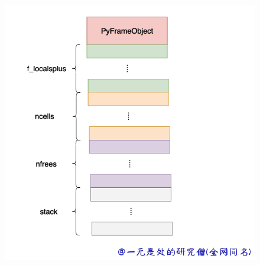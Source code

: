     \begin{figure}[H]
        \centering
            \includegraphics[scale=.25]{images/71-frame.png}
						\caption{ }
        \label{fig:my_label}
    \end{figure}
    
